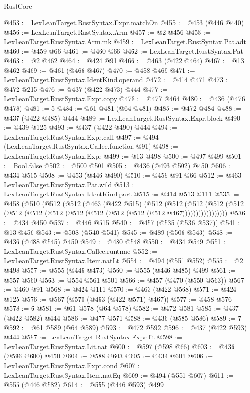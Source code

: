 \begin{lexlean}{RustCore}
\begin{coremodule}
@453 := LexLeanTarget.RustSyntax.Expr.matchOn
@455 := @453 (@446 @440)
@456 := LexLeanTarget.RustSyntax.Arm
@457 := @2 @456
@458 := LexLeanTarget.RustSyntax.Arm.mk
@459 := LexLeanTarget.RustSyntax.Pat.adt
@460 := @459 @66
@461 := @460 @66
@462 := LexLeanTarget.RustSyntax.Pat
@463 := @2 @462
@464 := @424 @91
@466 := @463 (@422 @464)
@467 := @13 @462
@469 := @461 (@466 @467)
@470 := @458 @469
@471 := LexLeanTarget.RustSyntax.IdentKind.operand
@472 := @414 @471
@473 := @472 @215
@476 := @437 (@422 @473) @444
@477 := LexLeanTarget.RustSyntax.Expr.copy
@478 := @477 @464
@480 := @436 (@476 @478)
@481 := 5
@484 := @61 @481 (@64 @481)
@485 := @472 @484
@488 := @437 (@422 @485) @444
@489 := LexLeanTarget.RustSyntax.Expr.block
@490 := @439 @125
@493 := @437 (@422 @490) @444
@494 := LexLeanTarget.RustSyntax.Expr.call
@497 := @494 (LexLeanTarget.RustSyntax.Callee.function @91)
@498 := LexLeanTarget.RustSyntax.Expr
@499 := @13 @498
@500 := @497 @499
@501 := Bool.false
@502 := @500 @501
@505 := @436 (@493 @502) @450
@506 := @434 @505
@508 := @453 (@446 @490)
@510 := @459 @91 @66
@512 := @463 LexLeanTarget.RustSyntax.Pat.wild
@513 := LexLeanTarget.RustSyntax.IdentKind.part
@515 := @414 @513 @111
@535 := @458
    (@510
      (@512
        (@512
          (@463
            (@422 @515)
            (@512
              (@512
                (@512
                  (@512 (@512 (@512 (@512 (@512 (@512 (@512 (@512 (@512 (@512 @467)))))))))))))))))
@536 := @434 @450
@537 := @446 @515
@540 := @457 (@535 (@536 @537))
@541 := @13 @456
@543 := @508 (@540 @541)
@545 := @489 (@506 @543)
@548 := @436 (@488 @545) @450
@549 := @480 @548
@550 := @434 @549
@551 := LexLeanTarget.RustSyntax.Callee.runtime
@552 := LexLeanTarget.RustSyntax.Item.natLt
@554 := @494 (@551 @552)
@555 := @2 @498
@557 := @555 (@446 @473)
@560 := @555 (@446 @485) @499
@561 := @557 @560
@563 := @554 @561 @501
@566 := @457 (@470 (@550 @563))
@567 := @460 @91
@568 := @424 @111
@570 := @463 (@422 @568)
@571 := @424 @125
@576 := @567 (@570 (@463 (@422 @571) @467))
@577 := @458 @576
@578 := 6
@581 := @61 @578 (@64 @578)
@582 := @472 @581
@585 := @437 (@422 @582) @444
@586 := @477 @571
@588 := @436 (@585 @586)
@589 := 7
@592 := @61 @589 (@64 @589)
@593 := @472 @592
@596 := @437 (@422 @593) @444
@597 := LexLeanTarget.RustSyntax.Expr.lit
@598 := LexLeanTarget.RustSyntax.Lit.nat
@600 := @597 (@598 @66)
@603 := @436 (@596 @600) @450
@604 := @588 @603
@605 := @434 @604
@606 := LexLeanTarget.RustSyntax.Expr.cond
@607 := LexLeanTarget.RustSyntax.Item.natEq
@609 := @494 (@551 @607)
@611 := @555 (@446 @582)
@614 := @555 (@446 @593) @499

\end{coremodule}
\end{lexlean}
